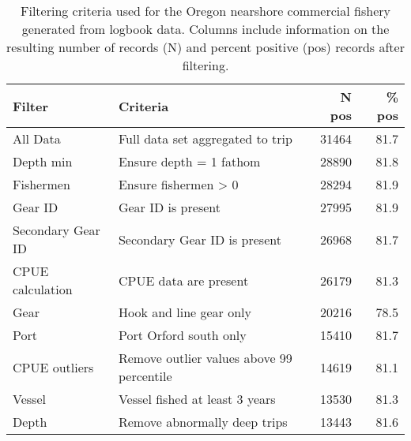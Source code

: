 
\begin{longtable}[t]{l>{\raggedright\arraybackslash}p{8cm}rr}
\caption{\label{tab:cpue-commercialfixed-gear-filter}Filtering criteria used for the Oregon nearshore commercial fishery  generated from logbook data. Columns include information on the resulting number of records (N) and percent positive (pos) records after filtering.}\\
\toprule
Filter & Criteria & N pos & \% pos\\
\midrule
All Data & Full data set aggregated to trip & 31464 & 81.7\\
Depth min & Ensure depth = 1 fathom & 28890 & 81.8\\
Fishermen & Ensure fishermen > 0 & 28294 & 81.9\\
Gear ID & Gear ID is present & 27995 & 81.9\\
Secondary Gear ID & Secondary Gear ID is present & 26968 & 81.7\\
CPUE calculation & CPUE data are present & 26179 & 81.3\\
Gear & Hook and line gear only & 20216 & 78.5\\
Port & Port Orford south only & 15410 & 81.7\\
CPUE outliers & Remove outlier values above 99 percentile & 14619 & 81.1\\
Vessel & Vessel fished at least 3 years & 13530 & 81.3\\
Depth & Remove abnormally deep trips & 13443 & 81.6\\
\bottomrule
\end{longtable}
